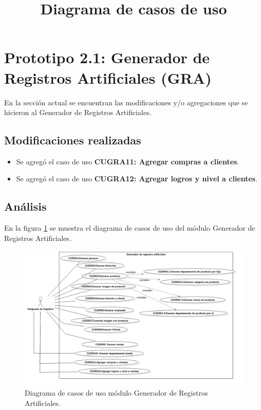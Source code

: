 \section{Prototipo 2.1: Generador de Registros Artificiales (GRA)}
En la sección actual se encuentran las modificaciones y/o agregaciones que se hicieron al Generador de Registros Artificiales.\\

\subsection{Modificaciones realizadas}
\begin{itemize}
\item Se agregó el caso de uso \textbf{CUGRA11: Agregar compras a clientes}.
\item Se agregó el caso de uso \textbf{CUGRA12: Agregar logros y nivel a clientes}.
\end{itemize}


\subsection{Análisis}


\title{\textbf{Diagrama de casos de uso}\\}
En la figura \ref{image:casosusoGRA11W} se muestra el diagrama de casos de uso del módulo Generador de Registros Artificiales.

\FloatBarrier
\begin{figure}[htbp!]
		\centering
			\includegraphics[width=1 \textwidth]{imagenes/CU/generadorRegistros11}
		\caption{Diagrama de casos de uso módulo Generador de Registros Artificiales.}
		\label{image:casosusoGRA11W}
\end{figure}
\FloatBarrier

